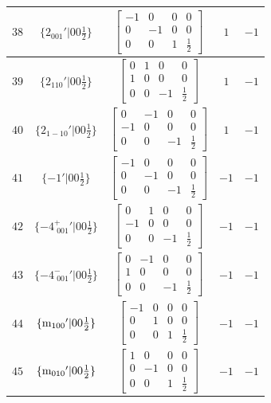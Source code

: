 \documentclass[fleqn,8pt]{jsarticle}
\begin{document}
\begin{longtable}{ccccc}
$ 38 $ & $ \{2{}_{001}{}'|0 0 \frac{1}{2}\} $ & $ \begin{bmatrix} -1 & 0 & 0 & 0 \\ 0 & -1 & 0 & 0 \\ 0 & 0 & 1 & \frac{1}{2} \end{bmatrix} $ & $ 1 $ & $ -1 $ \\ \hline
$ 39 $ & $ \{2{}_{110}{}'|0 0 \frac{1}{2}\} $ & $ \begin{bmatrix} 0 & 1 & 0 & 0 \\ 1 & 0 & 0 & 0 \\ 0 & 0 & -1 & \frac{1}{2} \end{bmatrix} $ & $ 1 $ & $ -1 $ \\ \hline
$ 40 $ & $ \{2{}_{1-10}{}'|0 0 \frac{1}{2}\} $ & $ \begin{bmatrix} 0 & -1 & 0 & 0 \\ -1 & 0 & 0 & 0 \\ 0 & 0 & -1 & \frac{1}{2} \end{bmatrix} $ & $ 1 $ & $ -1 $ \\ \hline
$ 41 $ & $ \{-1{}'|0 0 \frac{1}{2}\} $ & $ \begin{bmatrix} -1 & 0 & 0 & 0 \\ 0 & -1 & 0 & 0 \\ 0 & 0 & -1 & \frac{1}{2} \end{bmatrix} $ & $ -1 $ & $ -1 $ \\ \hline
$ 42 $ & $ \{-4^{+}_{\,\,001}{}'|0 0 \frac{1}{2}\} $ & $ \begin{bmatrix} 0 & 1 & 0 & 0 \\ -1 & 0 & 0 & 0 \\ 0 & 0 & -1 & \frac{1}{2} \end{bmatrix} $ & $ -1 $ & $ -1 $ \\ \hline
$ 43 $ & $ \{-4^{-}_{\,\,001}{}'|0 0 \frac{1}{2}\} $ & $ \begin{bmatrix} 0 & -1 & 0 & 0 \\ 1 & 0 & 0 & 0 \\ 0 & 0 & -1 & \frac{1}{2} \end{bmatrix} $ & $ -1 $ & $ -1 $ \\ \hline
$ 44 $ & $ \{{\rm m}_{100}{}'|0 0 \frac{1}{2}\} $ & $ \begin{bmatrix} -1 & 0 & 0 & 0 \\ 0 & 1 & 0 & 0 \\ 0 & 0 & 1 & \frac{1}{2} \end{bmatrix} $ & $ -1 $ & $ -1 $ \\ \hline
$ 45 $ & $ \{{\rm m}_{010}{}'|0 0 \frac{1}{2}\} $ & $ \begin{bmatrix} 1 & 0 & 0 & 0 \\ 0 & -1 & 0 & 0 \\ 0 & 0 & 1 & \frac{1}{2} \end{bmatrix} $ & $ -1 $ & $ -1 $ \\ \hline

\end{longtable}
\end{document}
